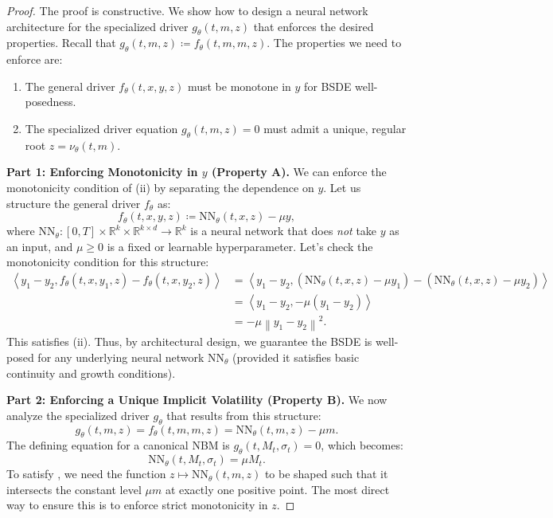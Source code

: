 \documentclass[qian]{imsart}
\newcommand{\R}{\mathbb{R}}
\newcommand{\norm}[1]{\left\lVert#1\right\rVert}
\newcommand{\scpr}[2]{\left\langle #1, #2 \right\rangle}
\theoremstyle{plain}
\theoremstyle{definition}
\begin{document}
\begin{proof}
The proof is constructive. We show how to design a neural network architecture for the specialized driver $g_\theta(t,m,z)$ that enforces the desired properties. Recall that $g_\theta(t,m,z) \coloneqq f_\theta(t,m,m,z)$. The properties we need to enforce are:
\begin{enumerate}
    \item[(A)] The general driver $f_\theta(t,x,y,z)$ must be monotone in $y$ for BSDE well-posedness.
    \item[(B)] The specialized driver equation $g_\theta(t,m,z)=0$ must admit a unique, regular root $z=\nu_\theta(t,m)$.
\end{enumerate}

\noindent\textbf{Part 1: Enforcing Monotonicity in $y$ (Property A).}
We can enforce the monotonicity condition of (ii) by separating the dependence on $y$. Let us structure the general driver $f_\theta$ as:
\[
    f_\theta(t,x,y,z) \coloneqq \text{NN}_\theta(t,x,z) - \mu y,
\]
where $\text{NN}_\theta: [0,T] \times \R^k \times \R^{k \times d} \to \R^k$ is a neural network that does \textit{not} take $y$ as an input, and $\mu \ge 0$ is a fixed or learnable hyperparameter.
Let's check the monotonicity condition for this structure:
\begin{align*}
    \scpr{y_1 - y_2}{f_\theta(t,x,y_1,z) - f_\theta(t,x,y_2,z)} &= \scpr{y_1 - y_2}{(\text{NN}_\theta(t,x,z) - \mu y_1) - (\text{NN}_\theta(t,x,z) - \mu y_2)} \\
    &= \scpr{y_1 - y_2}{-\mu(y_1 - y_2)} \\
    &= -\mu \norm{y_1 - y_2}^2.
\end{align*}
This satisfies (ii). Thus, by architectural design, we guarantee the BSDE is well-posed for any underlying neural network $\text{NN}_\theta$ (provided it satisfies basic continuity and growth conditions).

\noindent\textbf{Part 2: Enforcing a Unique Implicit Volatility (Property B).}
We now analyze the specialized driver $g_\theta$ that results from this structure:
\[
    g_\theta(t,m,z) = f_\theta(t,m,m,z) = \text{NN}_\theta(t,m,z) - \mu m.
\]
The defining equation for a canonical NBM is $g_\theta(t,M_t, \sigma_t) = 0$, which becomes:
\begin{equation} \label{eq:proof_nn_root}
    \text{NN}_\theta(t, M_t, \sigma_t) = \mu M_t.
\end{equation}
To satisfy , we need the function $z \mapsto \text{NN}_\theta(t,m,z)$ to be shaped such that it intersects the constant level $\mu m$ at exactly one positive point. The most direct way to ensure this is to enforce strict monotonicity in $z$.


\end{proof}
\end{document}
